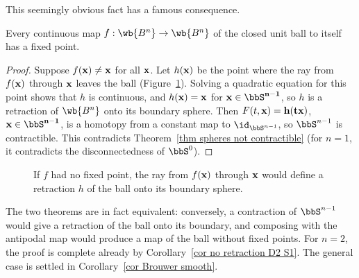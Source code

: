 This seemingly obvious fact has a famous consequence.

\begin{thm}\label{thm Brouwer's fixed point}
    Every continuous map $f:\wb{B^n}\to\wb{B^n}$ of the closed unit ball to itself has a fixed point.
\end{thm}
\begin{proof}
    Suppose $f(\bf{x})\neq \bf{x}$ for all $\bf{x}$. Let $h(\bf{x})$ be the point where the ray from $f(\bf{x})$ through $\bf{x}$ leaves the ball (Figure~\ref{fig Brouwer}). Solving a quadratic equation for this point shows that $h$ is continuous, and $h(\bf{x})=\bf{x}$ for $\bf{x}\in\bbS^{n-1}$, so $h$ is a retraction of $\wb{B^n}$ onto its boundary sphere. Then $F(t,\bf{x})=h(t\bf{x})$, $\bf{x}\in\bbS^{n-1}$, is a homotopy from a constant map to $\id_{\bbS^{n-1}}$, so $\bbS^{n-1}$ is contractible. This contradicts Theorem~\ref{thm spheres not contractible} (for $n=1$, it contradicts the disconnectedness of $\bbS^0$).
\end{proof}

\begin{figure}[tp]
    \centering
    \caption{If $f$ had no fixed point, the ray from $f(\bf{x})$ through $\bf{x}$ would define a retraction $h$ of the ball onto its boundary sphere.}
    \label{fig Brouwer}
\end{figure}

\begin{rem}\label{rem Brouwer equivalent}
    The two theorems are in fact equivalent: conversely, a contraction of $\bbS^{n-1}$ would give a retraction of the ball onto its boundary, and composing with the antipodal map would produce a map of the ball without fixed points. For $n=2$, the proof is complete already by Corollary~\ref{cor no retraction D2 S1}. The general case is settled in Corollary~\ref{cor Brouwer smooth}.
\end{rem}

